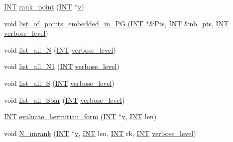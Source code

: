 \begin{DoxyCompactItemize}
\item 
\mbox{\hyperlink{galois_8h_a09fddde158a3a20bd2dcadb609de11dc}{I\+NT}} \mbox{\hyperlink{classhermitian_aabcb3c8b3fa2eb0fd676a253db9d917c}{rank\+\_\+point}} (\mbox{\hyperlink{galois_8h_a09fddde158a3a20bd2dcadb609de11dc}{I\+NT}} $\ast$\mbox{\hyperlink{simeon_8_c_aeb3f3030944801b163bc3b829a7f6710}{v}})
\item 
void \mbox{\hyperlink{classhermitian_aeca5f1aa7d9a4672724e496948172a8e}{list\+\_\+of\+\_\+points\+\_\+embedded\+\_\+in\+\_\+\+PG}} (\mbox{\hyperlink{galois_8h_a09fddde158a3a20bd2dcadb609de11dc}{I\+NT}} $\ast$\&Pts, \mbox{\hyperlink{galois_8h_a09fddde158a3a20bd2dcadb609de11dc}{I\+NT}} \&nb\+\_\+pts, \mbox{\hyperlink{galois_8h_a09fddde158a3a20bd2dcadb609de11dc}{I\+NT}} \mbox{\hyperlink{simeon_8_c_a818073fbcc2f439e7c56952f67386122}{verbose\+\_\+level}})
\item 
void \mbox{\hyperlink{classhermitian_aa3df8a3bcdea19eaed6a63ec15c79e54}{list\+\_\+all\+\_\+N}} (\mbox{\hyperlink{galois_8h_a09fddde158a3a20bd2dcadb609de11dc}{I\+NT}} \mbox{\hyperlink{simeon_8_c_a818073fbcc2f439e7c56952f67386122}{verbose\+\_\+level}})
\item 
void \mbox{\hyperlink{classhermitian_ae8094c1f22738d61696c3ecdee6749c9}{list\+\_\+all\+\_\+\+N1}} (\mbox{\hyperlink{galois_8h_a09fddde158a3a20bd2dcadb609de11dc}{I\+NT}} \mbox{\hyperlink{simeon_8_c_a818073fbcc2f439e7c56952f67386122}{verbose\+\_\+level}})
\item 
void \mbox{\hyperlink{classhermitian_ab0a4319e5d2040ca2c3fdc2191b98c7b}{list\+\_\+all\+\_\+S}} (\mbox{\hyperlink{galois_8h_a09fddde158a3a20bd2dcadb609de11dc}{I\+NT}} \mbox{\hyperlink{simeon_8_c_a818073fbcc2f439e7c56952f67386122}{verbose\+\_\+level}})
\item 
void \mbox{\hyperlink{classhermitian_a84c1abdcb4474b87a2a942f5ff4b0b1c}{list\+\_\+all\+\_\+\+Sbar}} (\mbox{\hyperlink{galois_8h_a09fddde158a3a20bd2dcadb609de11dc}{I\+NT}} \mbox{\hyperlink{simeon_8_c_a818073fbcc2f439e7c56952f67386122}{verbose\+\_\+level}})
\item 
\mbox{\hyperlink{galois_8h_a09fddde158a3a20bd2dcadb609de11dc}{I\+NT}} \mbox{\hyperlink{classhermitian_a8f44e894b4941a4bac5b985c69ba81e5}{evaluate\+\_\+hermitian\+\_\+form}} (\mbox{\hyperlink{galois_8h_a09fddde158a3a20bd2dcadb609de11dc}{I\+NT}} $\ast$\mbox{\hyperlink{simeon_8_c_aeb3f3030944801b163bc3b829a7f6710}{v}}, \mbox{\hyperlink{galois_8h_a09fddde158a3a20bd2dcadb609de11dc}{I\+NT}} len)
\item 
void \mbox{\hyperlink{classhermitian_a14b8d2fefc06ee5a6dddd22360178f78}{N\+\_\+unrank}} (\mbox{\hyperlink{galois_8h_a09fddde158a3a20bd2dcadb609de11dc}{I\+NT}} $\ast$\mbox{\hyperlink{simeon_8_c_aeb3f3030944801b163bc3b829a7f6710}{v}}, \mbox{\hyperlink{galois_8h_a09fddde158a3a20bd2dcadb609de11dc}{I\+NT}} len, \mbox{\hyperlink{galois_8h_a09fddde158a3a20bd2dcadb609de11dc}{I\+NT}} rk, \mbox{\hyperlink{galois_8h_a09fddde158a3a20bd2dcadb609de11dc}{I\+NT}} \mbox{\hyperlink{simeon_8_c_a818073fbcc2f439e7c56952f67386122}{verbose\+\_\+level}})

\end{DoxyCompactItemize}
